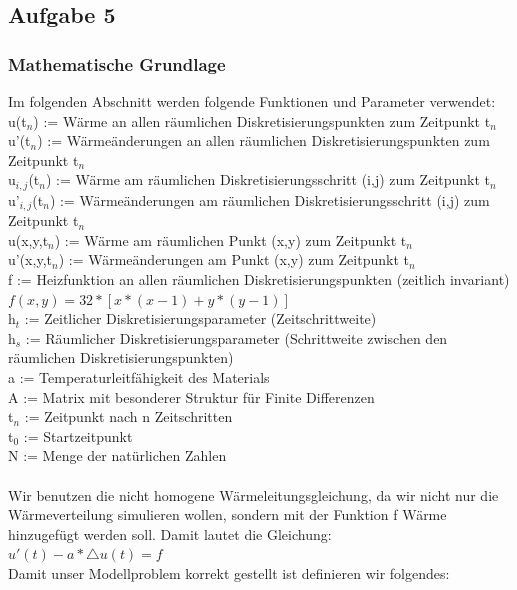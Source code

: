\documentclass{article}
\begin{document}
\subsection{Aufgabe 5}

\subsubsection{Mathematische Grundlage}
Im folgenden Abschnitt werden folgende Funktionen und Parameter verwendet:\\
u(t$_{n}$) := Wärme an allen räumlichen Diskretisierungspunkten zum Zeitpunkt t$_{n}$\\
u'(t$_{n}$) := Wärmeänderungen an allen räumlichen Diskretisierungspunkten zum Zeitpunkt t$_{n}$\\
u$_{i,j}$(t$_{n}$) := Wärme am räumlichen Diskretisierungsschritt (i,j) zum Zeitpunkt t$_{n}$\\
u'$_{i,j}$(t$_{n}$) := Wärmeänderungen am räumlichen Diskretisierungsschritt (i,j) zum Zeitpunkt t$_{n}$\\
u(x,y,t$_{n}$) := Wärme am räumlichen Punkt (x,y) zum Zeitpunkt t$_{n}$\\
u'(x,y,t$_{n}$) := Wärmeänderungen am Punkt (x,y) zum Zeitpunkt t$_{n}$\\
f := Heizfunktion an allen räumlichen Diskretisierungspunkten (zeitlich invariant) $f(x,y) = 32 * [x*(x-1)+y*(y-1)]$\\
h$_{t}$ := Zeitlicher Diskretisierungsparameter (Zeitschrittweite)\\
h$_{s}$ := Räumlicher Diskretisierungsparameter (Schrittweite zwischen den räumlichen Diskretisierungspunkten)\\
a := Temperaturleitfähigkeit des Materials \\
A := Matrix mit besonderer Struktur für Finite Differenzen\\
t$_{n}$ := Zeitpunkt nach n Zeitschritten\\
t$_{0}$ := Startzeitpunkt\\
N := Menge der natürlichen Zahlen\\
\\
Wir benutzen die nicht homogene Wärmeleitungsgleichung, da wir nicht nur die Wärmeverteilung simulieren wollen, sondern mit der Funktion f Wärme hinzugefügt werden soll. Damit lautet die Gleichung:\\
$u'(t) - a * \triangle u(t) = f$\\
Damit unser Modellproblem korrekt gestellt ist definieren wir folgendes:\\
\end{document}
